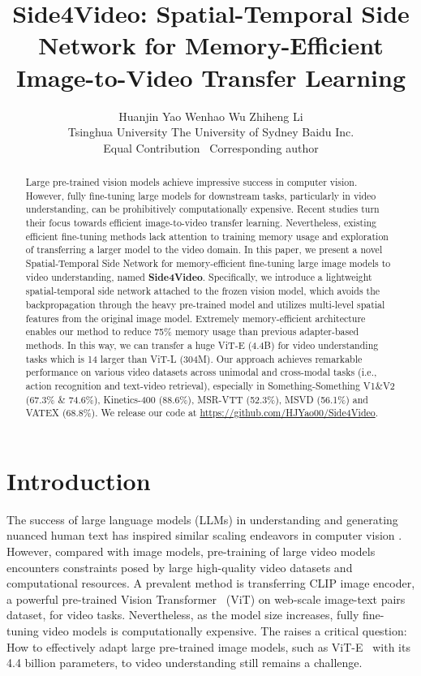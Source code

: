 \documentclass[10pt,twocolumn,letterpaper]{article}
\title{Side4Video: Spatial-Temporal Side Network for Memory-Efficient Image-to-Video Transfer Learning}
\author{Huanjin Yao \qquad
Wenhao Wu \qquad
Zhiheng Li\\
Tsinghua University \quad The University of Sydney \quad Baidu Inc. \\ 
{\small  Equal Contribution \qquad \Envelope~Corresponding author} \\
}
\begin{document}
\maketitle
\begin{abstract}
Large pre-trained vision models achieve impressive success in computer vision. However, fully fine-tuning large models for downstream tasks, particularly in video understanding, can be prohibitively computationally expensive. Recent studies turn their focus towards efficient image-to-video transfer learning. Nevertheless, existing efficient fine-tuning methods lack attention to training memory usage and exploration of transferring a larger model to the video domain. In this paper, we present a novel Spatial-Temporal Side Network for memory-efficient fine-tuning large image models to video understanding, named \textbf{Side4Video}. Specifically, we introduce a lightweight spatial-temporal side network attached to the frozen vision model, which avoids the backpropagation through the heavy pre-trained model and utilizes multi-level spatial features from the original image model. Extremely memory-efficient architecture enables our method to reduce 75\% memory usage than previous adapter-based methods. In this way, we can transfer a huge ViT-E (4.4B) for video understanding tasks which is 14 larger than ViT-L (304M). Our approach achieves remarkable performance on various video datasets across unimodal and cross-modal tasks (i.e., action recognition and text-video retrieval), especially in Something-Something V1\&V2 (67.3\% \& 74.6\%), Kinetics-400 (88.6\%), MSR-VTT (52.3\%), MSVD (56.1\%) and VATEX (68.8\%).
We release our code at \url{https://github.com/HJYao00/Side4Video}.
\end{abstract}



%
 \section{Introduction}
\label{sec:intro}

\graphicspath{{figure/}}

The success of large language models (LLMs) \cite{llama, gpt-3, T5} in understanding and generating nuanced human text has inspired similar scaling endeavors in computer vision \cite{scale_vit, vit-22B, open_clip, eva}. However, compared with image models, pre-training of large video models encounters constraints posed by large high-quality video datasets and computational resources. A prevalent method is transferring CLIP image encoder, a powerful pre-trained Vision Transformer~\cite{vit} (ViT) on web-scale image-text pairs dataset, for video tasks. Nevertheless, as the model size increases, fully fine-tuning video models is computationally expensive. The raises a critical question: How to effectively adapt large pre-trained image models, such as ViT-E~\cite{eva} with its 4.4 billion parameters, to video understanding still remains a challenge.
\end{document}

